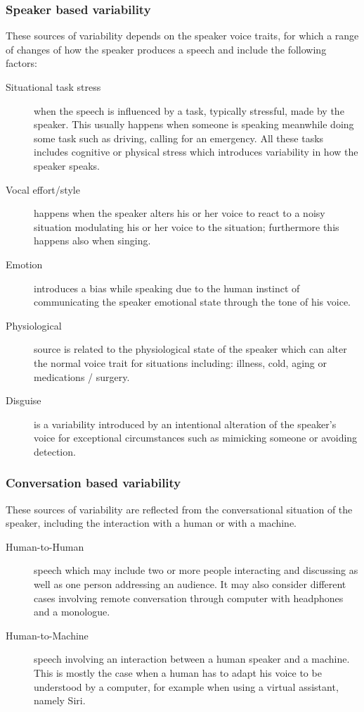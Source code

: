 \begin{itemize}
\begin{figure}[h]
\end{figure}

\subsubsection{Speaker based variability}
These sources of variability depends on the speaker voice traits,
for which a range of changes of how the speaker produces a speech and
include the following factors:

\begin{description}
    \item[Situational task stress] when the speech is influenced by a task,
    typically stressful, made by the speaker. This usually happens when someone
    is speaking meanwhile doing some task such as driving, calling for an emergency.
    All these tasks includes cognitive or physical stress which introduces variability
    in how the speaker speaks.
    \item[Vocal effort/style] happens when the speaker alters his or her voice to react to
    a noisy situation modulating his or her voice to the situation; furthermore this happens
    also when singing.
    \item[Emotion] introduces a bias while speaking due to the human instinct of communicating
    the speaker emotional state through the tone of his voice.
    \item[Physiological] source is related to the physiological state of the speaker which
    can alter the normal voice trait for situations including: illness, cold, aging or medications / surgery.
    \item[Disguise] is a variability introduced by an intentional alteration of the speaker's voice
    for exceptional circumstances such as mimicking someone or avoiding detection.
\end{description}



\subsubsection{Conversation based variability}

These sources of variability are reflected from the conversational
situation of the speaker, including the interaction with a human
or with a machine.

\begin{description}
    \item[Human-to-Human] speech which may include two or more
    people interacting and discussing as well as one person addressing
    an audience. It may also consider different cases involving remote conversation
    through computer with headphones and a monologue.
    \item[Human-to-Machine] speech involving an interaction between a human
    speaker and a machine. This is mostly the case when a human has to adapt his
    voice to be understood by a computer, for example when using a virtual assistant, namely
    Siri.
\end{description}



\end{itemize}
